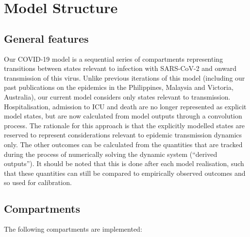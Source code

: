\section{Model Structure}

\subsection{General features}

Our COVID-19 model is a sequential series of compartments representing transitions between states relevant to infection with SARS-CoV-2 and onward transmission of this virus.
Unlike previous iterations of this model (including our past publications on the epidemics in the Philippines, Malaysia and Victoria, Australia), our current model considers only states relevant to transmission.
Hospitalisation, admission to ICU and death are no longer represented as explicit model states, but are now calculated from model outputs through a convolution process.
The rationale for this approach is that the explicitly modelled states are reserved to represent considerations relevant to epidemic transmission dynamics only.
The other outcomes can be calculated from the quantities that are tracked during the process of numerically solving the dynamic system (``derived outputs'').
It should be noted that this is done after each model realisation, such that these quantities can still be compared to empirically observed outcomes and so used for calibration.

\subsection{Compartments}
The following compartments are implemented:
